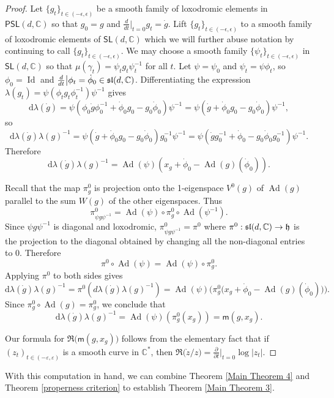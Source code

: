 \documentclass{amsart}
\theoremstyle{plain}
\theoremstyle{definition}
\theoremstyle{remark}
\newcommand{\Ad}{\operatorname{Ad}}
\newcommand{\Id}{{\operatorname{Id}}}
\newcommand{\PSL}{\mathsf{PSL}}
\newcommand{\SL}{\mathsf{SL}}
\renewcommand{\sf}[1]{{\mathsf{#1}}}
\newcommand{\C}{\mathbb C}
\renewcommand{\sl}{\mathfrak{sl}}
\newcommand{\<}{\left <}
\renewcommand{\>}{\right >}
\newcommand{\g}{\gamma}
\renewcommand{\C}{\mathbb C}
\newcommand{\eps}{\varepsilon}
\newcommand{\dd}{{\mathrm{d}}}
\begin{document}
\begin{proof}
Let $\{g_t\}_{t\in (-\epsilon,\epsilon)}$ be a smooth family of loxodromic elements  in $\PSL(d,\C)$
so that $g_0=g$ and $\frac{d}{dt}\big|_{t=0} g_t=\dot g$. Lift
$\{g_t\}_{t\in (-\epsilon,\epsilon)}$ to a smooth family of loxodromic elements
of $\SL(d,\C)$  which we will further abuse notation by continuing to call $\{g_t\}_{t\in (-\epsilon,\epsilon)}$.
We may choose a smooth family $\{\psi_t\}_{t\in (-\epsilon,\epsilon)}$ in $\SL(d,\mathbb C)$
so that  $\mu(\g_t) = \psi_t  g_t\psi_t^{-1}$ for all $t$.
Let  $\psi=\psi_0$ and $\psi_t = \psi\phi_t$, so $\phi_0 = \Id$ and $\frac{d}{dt}\big| \phi_t=\dot\phi_0\in\frak{sl}(d,\C)$.
Differentiating the expression $\lambda(g_t) = \psi (\phi_t  g_t\phi_t^{-1})\psi^{-1}$ gives
$$\dd\lambda(\dot{g})  = \psi(\phi_0\dot g\phi_0^{-1}+\dot\phi_0 g_0- g_0\dot\phi_0)\psi^{-1} = 
\psi(\dot g+\dot\phi_0 g_0- g_0\dot\phi_0)\psi^{-1},$$
so
$$\dd\lambda(\dot{g})\lambda(g)^{-1} = \psi(\dot g +\dot\phi_0 g_0-  g_0\dot\phi_0) g_0^{-1}\psi^{-1} = 
\psi(\dot g g_0^{-1} + \dot\phi_0- g_0\dot\phi_0 g_0^{-1})\psi^{-1}.$$
Therefore
$$\dd\lambda(\dot{g})\lambda(g)^{-1} =  \Ad(\psi)(x_g + \dot\phi_0-\Ad(g)(\dot\phi_0)).$$

Recall that the  map $\pi^0_g$  is projection onto the 1-eigenspace $V^0(g)$ of $\Ad(g)$ parallel to  the sum $W(g)$ of the other eigenspaces.
Thus
$$\pi_{\psi g\psi^{-1}}^0  = \Ad(\psi)\circ \pi^0_g\circ \Ad(\psi^{-1}).$$ 
Since  $\psi g\psi^{-1}$ is diagonal and loxodromic, $\pi^0_{\psi g\psi^{-1}} = \pi^0$ where $\pi^0:\sl(d,\C)\rightarrow \frak h$ 
is  the projection to the diagonal obtained by changing all the non-diagonal entries to $0$. Therefore  
$$\pi^0 \circ \Ad(\psi) = \Ad(\psi)\circ \pi^0_g.$$
Applying $\pi^0$ to  both sides gives
$$\dd\lambda(\dot{g})\lambda(g)^{-1}= \pi^0(d\lambda(\dot{g})\lambda(g)^{-1}) = \Ad(\psi)\Big(\pi_g^0\big(x_g+\dot\phi_0-\Ad(g)(\dot\phi_0)\big)\Big).$$
Since $\pi_g^0\circ \Ad(g) = \pi_g^0$, we conclude that
 $$\mathrm d\lambda(\dot{g})\lambda(g)^{-1} = \Ad(\psi)(\pi_g^0(x_g)) = \sf m(g,x_g).$$

Our formula for $\Re\Big(\sf m(g,x_g)\Big)$ follows from the elementary fact that if $(z_t)_{t\in(-\eps,\eps)}$ is a smooth curve in $\C^*$,
then $\Re\big(\dot z/z\big)=\frac{\partial}{\partial t}\big|_{t=0}\log|z_t|.$
\end{proof}

With this computation in hand, we can combine Theorem \ref{Main Theorem 4} and Theorem \ref{properness criterion} 
to establish Theorem \ref{Main Theorem 3}.
\end{document}
